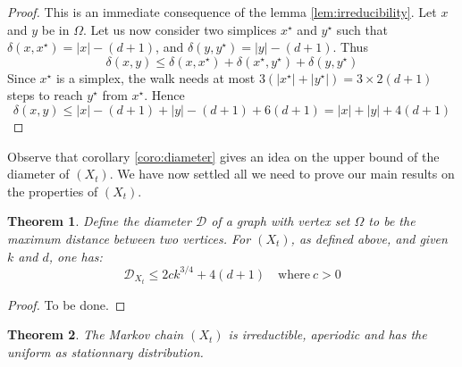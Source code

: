 \documentclass[a4paper]{article}
\newtheorem{theorem}{Theorem}
\begin{document}
\begin{proof}
  This is an immediate consequence of the lemma \ref{lem:irreducibility}. Let $x$ and $y$ be in $\Omega$. Let us now consider two simplices $x^\star$ and $y^\star$ such that $\delta(x,x^\star) = |x| - (d+1)$, and $\delta(y,y^\star) = |y| - (d+1)$. Thus
  $$
    \delta(x,y) \leq{\delta(x,x^\star) + \delta(x^\star,y^\star) + \delta(y,y^\star)}
  $$
  Since $x^\star$ is a simplex, the walk needs at most $3(|x^\star| + |y^\star|) = 3 \times 2(d+1)$ steps to reach $y^\star$ from $x^\star$. Hence
  $$
    \delta(x,y) \leq{|x| - (d+1) + |y| - (d+1) + 6(d+1)} = |x| + |y| + 4(d+1)
  $$
\end{proof}

Observe that corollary \ref{coro:diameter} gives an idea on the upper bound of the diameter of $(X_t)$. We have now settled all we need to prove our main results on the properties of $(X_t)$.

\begin{theorem}\label{thm:diameter}
  Define the diameter $\mathcal{D}$ of a graph with vertex set $\Omega$ to be the maximum distance between two vertices. For $(X_t)$, as defined above, and given $k$ and $d$, one has:
  \begin{equation}
    \mathcal{D}_{X_t} \leq{2ck^{3/4} + 4(d+1)} \quad \mbox{where} \ c>0
  \end{equation}
\end{theorem}

\begin{proof}
  To be done.
\end{proof}

\begin{theorem}\label{thm:main}
  The Markov chain $(X_t)$ is irreductible, aperiodic and has the uniform as stationnary distribution.
\end{theorem}
\end{document}
